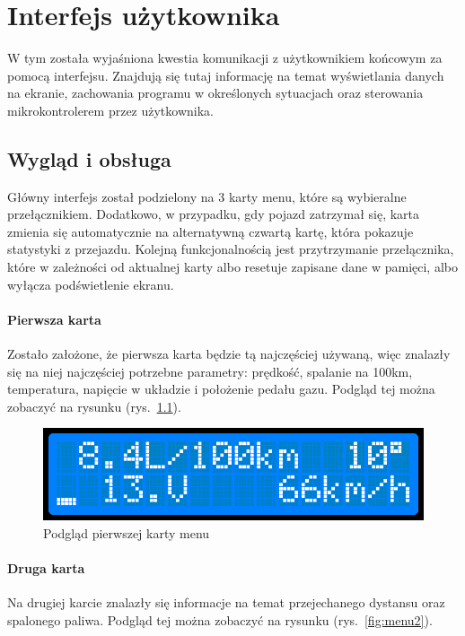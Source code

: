 \chapter{Interfejs użytkownika}
\par W tym została wyjaśniona kwestia komunikacji z użytkownikiem końcowym za pomocą interfejsu. Znajdują się tutaj informację na temat wyświetlania danych na ekranie, zachowania programu w określonych sytuacjach oraz sterowania mikrokontrolerem przez użytkownika.
\section{Wygląd i obsługa}

\par Główny interfejs został podzielony na 3 karty menu, które są wybieralne przełącznikiem. Dodatkowo, w przypadku, gdy pojazd zatrzymał się, karta zmienia się automatycznie na alternatywną czwartą kartę, która pokazuje statystyki z przejazdu. Kolejną funkcjonalnością jest przytrzymanie przełącznika, które w zależności od aktualnej karty albo resetuje zapisane dane w pamięci, albo wyłącza podświetlenie ekranu.

\subsubsection{Pierwsza karta}

Zostało założone, że pierwsza karta będzie tą najczęściej używaną, więc znalazły się na niej najczęściej potrzebne parametry: prędkość, spalanie na 100km, temperatura, napięcie w układzie i położenie pedału gazu. Podgląd tej można zobaczyć na rysunku (rys.~\ref{fig:menu1}).

\begin{figure}[!htb]
\centering
\includegraphics[width=0.7\linewidth]{Rysunki/menu1.png}
\caption{Podgląd pierwszej karty menu}
\label{fig:menu1}
\end{figure}

\subsubsection{Druga karta}
Na drugiej karcie znalazły się informacje na temat przejechanego dystansu oraz spalonego paliwa. Podgląd tej można zobaczyć na rysunku (rys.~\ref{fig:menu2}).

